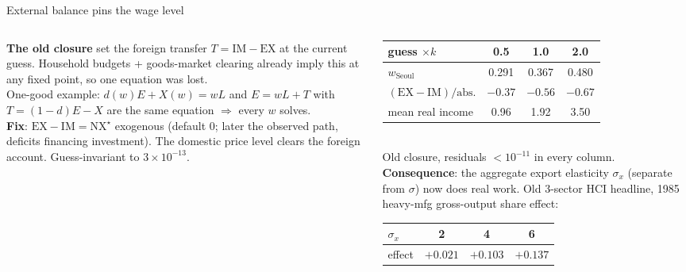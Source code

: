 \documentclass[10pt,aspectratio=169]{beamer}
\begin{document}
\begin{frame}{External balance pins the wage level}
  \begin{columns}[T]
    \begin{column}{0.5\textwidth}
      \small
      \textbf{The old closure} set the foreign transfer $T=\mathrm{IM}-\mathrm{EX}$ at the
      current guess. Household budgets + goods-market clearing already imply this at any
      fixed point, so one equation was lost.\\[0.4em]
      One-good example: $d(w)E+X(w)=wL$ and $E=wL+T$ with $T=(1-d)E-X$ are the same
      equation $\Rightarrow$ every $w$ solves.\\[0.4em]
      \textbf{Fix}: $\mathrm{EX}-\mathrm{IM}=\mathrm{NX}^\star$ exogenous (default 0;
      later the observed path, deficits financing investment). The domestic price level
      clears the foreign account. Guess-invariant to $3\times10^{-13}$.
    \end{column}
    \begin{column}{0.46\textwidth}
      \footnotesize
      \begin{tabular}{@{}lccc@{}}
        \toprule
        guess $\times k$ & 0.5 & 1.0 & 2.0 \\
        \midrule
        $w_{\text{Seoul}}$ & 0.291 & 0.367 & 0.480 \\
        $(\mathrm{EX}-\mathrm{IM})/\text{abs.}$ & $-0.37$ & $-0.56$ & $-0.67$ \\
        mean real income & 0.96 & 1.92 & 3.50 \\
        \bottomrule
      \end{tabular}\\[0.2em]
      \tiny Old closure, residuals $<10^{-11}$ in every column.\\[0.6em]
      \small
      \textbf{Consequence}: the aggregate export elasticity $\sigma_x$ (separate from
      $\sigma$) now does real work. Old 3-sector HCI headline, 1985 heavy-mfg
      gross-output share effect:\\[0.2em]
      \footnotesize
      \begin{tabular}{@{}lccc@{}}
        \toprule
        $\sigma_x$ & 2 & 4 & 6 \\
        \midrule
        effect & $+0.021$ & $+0.103$ & $+0.137$ \\
        \bottomrule
      \end{tabular}
    \end{column}
  \end{columns}
\end{frame}
\end{document}
